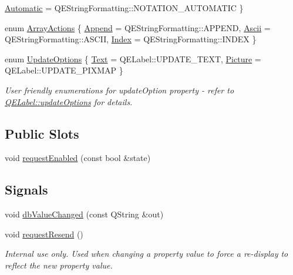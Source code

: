 \begin{DoxyCompactItemize}
\hyperlink{classQELabel_ab0a211fb5b8bd3f95b8c40b4aaaf839caf6ea2e9da8c9c357415366ad03eab9f8}{Automatic} =  QEStringFormatting::NOTATION\_\-AUTOMATIC
 \}
\item 
enum \hyperlink{classQELabel_a276168b3a99f546208827eda615caa7b}{ArrayActions} \{ \hyperlink{classQELabel_a276168b3a99f546208827eda615caa7ba16addd13bf5c709c686da68cd08c0f16}{Append} =  QEStringFormatting::APPEND, 
\hyperlink{classQELabel_a276168b3a99f546208827eda615caa7bab508bd969b734ac57d47304884a47a61}{Ascii} =  QEStringFormatting::ASCII, 
\hyperlink{classQELabel_a276168b3a99f546208827eda615caa7baa27074ccec78e1f3bcca9016d8b3bf87}{Index} =  QEStringFormatting::INDEX
 \}
\item 
enum \hyperlink{classQELabel_aae708a1c23d06d625b4f2f87bdc3fbe4}{UpdateOptions} \{ \hyperlink{classQELabel_aae708a1c23d06d625b4f2f87bdc3fbe4adbd0c95df95a30b6ff87a5f162180b6d}{Text} =  QELabel::UPDATE\_\-TEXT, 
\hyperlink{classQELabel_aae708a1c23d06d625b4f2f87bdc3fbe4ac8d2c92a8dfc5f3b3a410423b5f2e60b}{Picture} =  QELabel::UPDATE\_\-PIXMAP
 \}
\begin{DoxyCompactList}\small\item\em User friendly enumerations for updateOption property -\/ refer to \hyperlink{classQELabel_ab16e8eccc9c9f29ca83472a52913b7f2}{QELabel::updateOptions} for details. \end{DoxyCompactList}\end{DoxyCompactItemize}
\subsection*{Public Slots}
\begin{DoxyCompactItemize}
\item 
void \hyperlink{classQELabel_a0110f2df7d7467a8ea14777a8d8cd1ad}{requestEnabled} (const bool \&state)
\end{DoxyCompactItemize}
\subsection*{Signals}
\begin{DoxyCompactItemize}
\item 
void \hyperlink{classQELabel_afd21126e84d2c951326ad023f0d550b3}{dbValueChanged} (const QString \&out)
\item 
\hypertarget{classQELabel_a10ed2ce494baef58b3962164e5d1e946}{
void \hyperlink{classQELabel_a10ed2ce494baef58b3962164e5d1e946}{requestResend} ()}
\label{classQELabel_a10ed2ce494baef58b3962164e5d1e946}

\begin{DoxyCompactList}\small\item\em Internal use only. Used when changing a property value to force a re-\/display to reflect the new property value. \end{DoxyCompactList}\end{DoxyCompactItemize}
